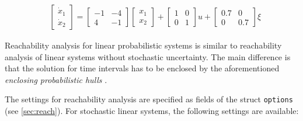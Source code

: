 \begin{center}
\begin{minipage}[t]{0.58\textwidth}
	\begin{equation*}
\begin{split}
	& \begin{bmatrix} \dot x_1 \\ \dot x_2 \end{bmatrix} = \begin{bmatrix} -1 & -4 \\ 4 & -1 \end{bmatrix} \begin{bmatrix} x_1 \\ x_2 \end{bmatrix} + \begin{bmatrix} 1 & 0\\ 0 & 1 \end{bmatrix} u + \begin{bmatrix} 0.7 & 0\\ 0 & 0.7 \end{bmatrix} \xi 
\end{split}
\end{equation*}
\end{minipage}
\begin{minipage}[t]{0.38\textwidth}
	\vspace{5pt}
	\footnotesize
	
\end{minipage}
\end{center}

\vspace{1cm}


Reachability analysis for linear probabilistic systems is  similar to reachability analysis of linear systems without stochastic uncertainty. The main difference is that the solution for time intervals has to be enclosed by the aforementioned \textit{enclosing probabilistic hulls} \cite{Althoff2009d}.

The settings for reachability analysis are specified as fields of the struct \texttt{options} (see \cref{sec:reach}). For stochastic linear systems, the following settings are available:

